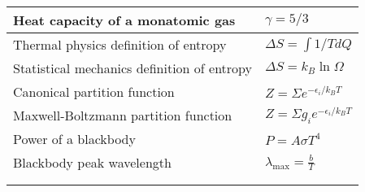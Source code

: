 \documentclass[11pt]{paper}
\begin{document}
\begin{longtable}{ll}
\multicolumn{1}{|l|}{Heat capacity of a monatomic gas} & \multicolumn{1}{l|}{$\gamma = 5/3$} \\ \hline
\multicolumn{1}{|l|}{Thermal physics definition of entropy} & \multicolumn{1}{l|}{$\Delta S = \int 1/T dQ$} \\ \hline
\multicolumn{1}{|l|}{Statistical mechanics definition of entropy} & \multicolumn{1}{l|}{$\Delta S = k_B \ln \Omega$} \\ \hline
\multicolumn{1}{|l|}{Canonical partition function} & \multicolumn{1}{l|}{$Z = \Sigma e^{-\epsilon_i/k_BT}$} \\ \hline
\multicolumn{1}{|l|}{Maxwell-Boltzmann partition function} & \multicolumn{1}{l|}{$Z = \Sigma g_i e^{-\epsilon_i/k_BT}$} \\ \hline
\multicolumn{1}{|l|}{Power of a blackbody} & \multicolumn{1}{l|}{$P = A \sigma T^4$} \\ \hline
\multicolumn{1}{|l|}{Blackbody peak wavelength} & \multicolumn{1}{l|}{$\lambda_\text{max} = \frac{b}{T}$} \\ \hline\\\\
\end{longtable}

\newpage
\end{document}
